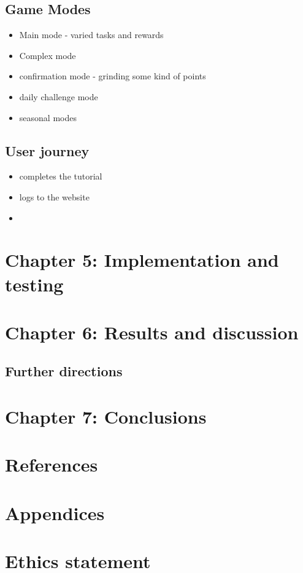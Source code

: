 \documentclass{article}
\begin{document}
\subsection{Game Modes}
\begin{itemize}
  \item Main mode - varied tasks and rewards
  \item Complex mode
  \item confirmation mode - grinding some kind of points
  \item daily challenge mode
  \item seasonal modes
\end{itemize}

\subsection{User journey}
\begin{itemize}
  \item completes the tutorial
  \item logs to the website
  \item 
\end{itemize}
\blindtext
\newpage

\section{Chapter 5: Implementation and testing}
\blindtext
\newpage

\section{Chapter 6: Results and discussion}

\blindtext

\subsection{Further directions}

\newpage

\section{Chapter 7: Conclusions}
\blindtext
\newpage

\section{References}
\blindtext
\newpage

\section{Appendices}
\blindtext
\newpage

\section{Ethics statement}
\blindtext
\newpage
\end{document}
